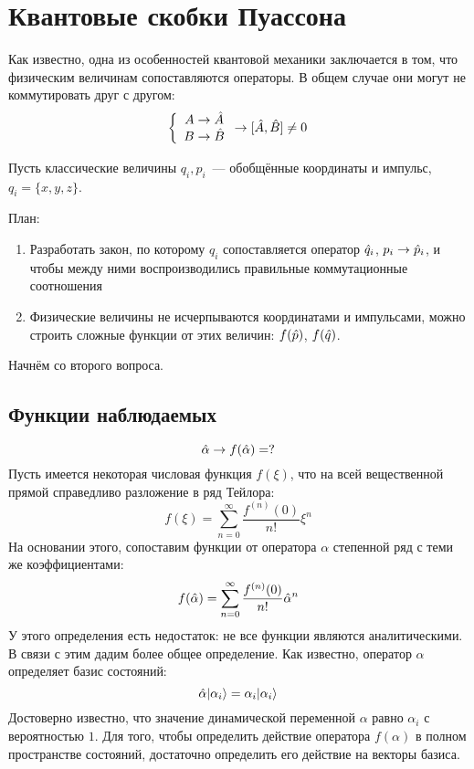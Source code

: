 \section{Квантовые скобки Пуассона}

Как известно, одна из особенностей квантовой механики заключается в том, что физическим величинам сопоставляются операторы. В общем случае они могут не коммутировать друг с другом:
$$
\left\{
\begin{array}{c}
  A \to \Hat A \\
  B \to \Hat B
\end{array}
\to [\Hat A, \Hat B] \neq 0
\right.
$$

Пусть классические величины $q_i, p_i$~--- обобщённые координаты и импульс, $q_i = \{x, y, z\}$.

План:
\begin{enumerate}
  \item Разработать закон, по которому $q_i$ сопоставляется оператор $\Hat q_i$, $p_i \to \Hat p_i$, и чтобы между ними воспроизводились правильные коммутационные соотношения
  \item Физические величины не исчерпываются координатами и импульсами, можно строить сложные функции от этих величин: $f(\Hat p)$, $f(\Hat q)$.
\end{enumerate}
Начнём со второго вопроса.
\subsection{Функции наблюдаемых}
$$
    \Hat \alpha \to f(\Hat \alpha) = ?
$$
\Def Пусть имеется некоторая числовая функция $f(\xi)$, что на всей вещественной прямой справедливо разложение в ряд Тейлора:
$$
    f(\xi) = \sum_{n=0}^\infty \dfrac{f^{(n)} (0)}{n!} \xi^n
$$
На основании этого, сопоставим функции от оператора $\alpha$ степенной ряд с теми же коэффициентами:
$$
    f(\Hat \alpha) = \sum_{n=0}^{\infty} \dfrac{f^{(n)} (0)}{n!} {\Hat \alpha}^n
$$
\Rem У этого определения есть недостаток: не все функции являются аналитическими. В связи с этим дадим более общее определение. Как известно, оператор $\alpha$ определяет базис состояний:
$$
    \Hat \alpha | \alpha_i \rangle = \alpha_i | \alpha_i \rangle
$$
Достоверно известно, что значение динамической переменной $\alpha$ равно $\alpha_i$ с вероятностью $1$.
Для того, чтобы определить действие оператора $f(\alpha)$ в полном пространстве состояний, достаточно определить его действие на векторы базиса.

